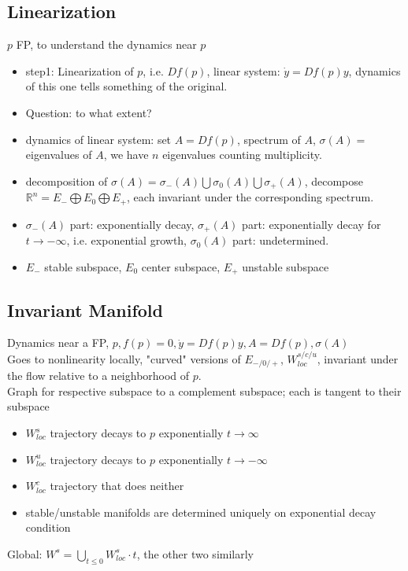 \documentclass[10pt,a4paper]{article}
\begin{document}
\subsection{Linearization}
$p$ FP, to understand the dynamics near $p$
\begin{itemize}
	\item step1: Linearization of $p$, i.e. $Df(p)$, linear system: $\dot{y}=Df(p)y$, dynamics of this one tells something of the original.
	\item Question: to what extent?
	\item dynamics of linear system: set $A=Df(p)$, spectrum of $A$, $\sigma(A)=$eigenvalues of $A$, we have $n$ eigenvalues counting multiplicity.
	\item decomposition of $\sigma(A)=\sigma_{-}(A)\bigcup\sigma_{0}(A)\bigcup\sigma_{+}(A)$, decompose $\mathbb{R}^n=E_{-}\bigoplus E_{0}\bigoplus E_{+}$, each invariant under the corresponding spectrum.
	\item $\sigma_{-}(A)$ part: exponentially decay, $\sigma_{+}(A)$ part: exponentially decay for $t\to-\infty$, i.e. exponential growth, $\sigma_{0}(A)$ part: undetermined.
	\item $E_{-}$ stable subspace, $E_{0}$ center subspace, $E_{+}$ unstable subspace
\end{itemize}

\subsection{Invariant Manifold}
Dynamics near a FP, $p,f(p)=0,\dot{y}=Df(p)y,A=Df(p),\sigma(A)$\\
Goes to nonlinearity locally, "curved" versions of $E_{-/0/+}$, $W_{loc}^{s/c/u}$, invariant under the flow relative to a neighborhood of $p$.\\
Graph for respective subspace to a complement subspace; each is tangent to their subspace \\
\begin{itemize}
	\item $W_{loc}^s$ trajectory decays to $p$ exponentially $t\to\infty$
	\item $W_{loc}^u$ trajectory decays to $p$ exponentially $t\to -\infty$
	\item $W_{loc}^c$ trajectory that does neither
	\item stable/unstable manifolds are determined uniquely on exponential decay condition
\end{itemize}
Global: $W^s=\bigcup_{t\leq 0}W_{loc}^s\cdot t$, the other two similarly\\
\end{document}
